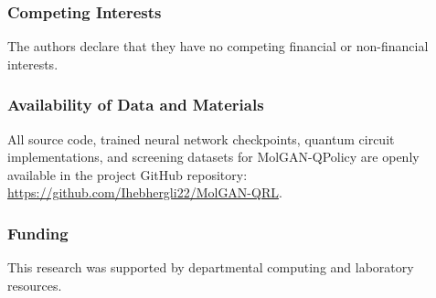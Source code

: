 \documentclass[10pt,a4paper]{article}
\begin{document}
\subsubsection*{Competing Interests}
The authors declare that they have no competing financial or non-financial interests.

\subsubsection*{Availability of Data and Materials}
All source code, trained neural network checkpoints, quantum circuit implementations, and screening datasets for MolGAN-QPolicy are openly available in the project GitHub repository: \url{https://github.com/Ihebhergli22/MolGAN-QRL}.

\subsubsection*{Funding}
This research was supported by departmental computing and laboratory resources.
\end{document}
